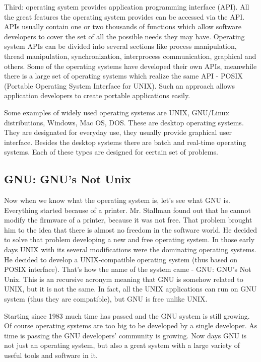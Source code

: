 Third: operating system provides application programming interface (API). All the great features the operating system provides can be accessed via the API. APIs usually contain one or two thousands of functions which allow software developers to cover the set of all the possible needs they may have. Operating system APIs can be divided into several sections like process manipulation, thread manipulation, synchronization, interprocess communication, graphical and others. Some of the operating systems have developed their own APIs, meanwhile there is a large set of operating systems which realize the same API - POSIX (Portable Operating System Interface for UNIX). Such an approach allows application developers to create portable applications easily.

Some examples of widely used operating systems are UNIX, GNU/Linux distributions, Windows, Mac OS, DOS. These are desktop operating systems. They are designated for everyday use, they usually provide graphical user interface. Besides the desktop systems there are batch and real-time operating systems. Each of these types are designed for certain set of problems.

\subsection{GNU: GNU's Not Unix}
Now when we know what the operating system is, let's see what GNU is. Everything started because of a printer. Mr. Stallman found out that he cannot modify the firmware of a printer, because it was not free. That problem brought him to the idea that there is almost no freedom in the software world. He decided to solve that problem developing a new and free operating system. In those early days UNIX with its several modifications were the dominating operating systems. He decided to develop a UNIX-compatible operating system (thus based on POSIX interface). That's how the name of the system came - GNU: GNU's Not Unix. This is an recursive acronym meaning that GNU is somehow related to UNIX, but it is not the same. In fact, all the UNIX applications can run on GNU system (thus they are compatible), but GNU is free unlike UNIX.

Starting since 1983 much time has passed and the GNU system is still growing. Of course operating systems are too big to be developed by a single developer. As time is passing the GNU developers' community is growing. Now days GNU is not just an operating system, but also a great system with a large variety of useful tools and software in it.

